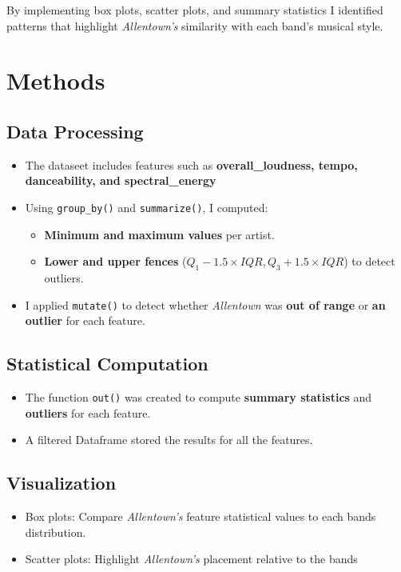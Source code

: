 \documentclass{article}\usepackage[]{graphicx}\usepackage[]{xcolor}
\begin{document}
\begin{multicols}{2}
\noindent By implementing box plots, scatter plots, and summary statistics I identified patterns that highlight \textit{Allentown's} similarity with each band's musical style.


\section{Methods}

\subsection{Data Processing}
\begin{itemize}
\item The dataseet includes features such as \textbf{overall\_loudness, tempo, danceability, and spectral\_energy}
\item Using \texttt{group\_by()} and \texttt{summarize()}, I computed:
\begin{itemize}
\item \textbf{Minimum and maximum values} per artist.
\item \textbf{Lower and upper fences} ($Q_1 - 1.5 \times IQR, Q_3 + 1.5 \times IQR$) to detect outliers.
\end{itemize}

\item I applied \texttt{mutate()} to detect whether \textit{Allentown} was \textbf{out of range} or \textbf{an outlier} for each feature.
\end{itemize}

\subsection{Statistical Computation}
\begin{itemize}
\item The function \texttt{out()} was created to compute \textbf{summary statistics} and \textbf{outliers} for each feature.
\item A filtered Dataframe stored the results for all the features.
\end{itemize}

\subsection{Visualization}
\begin{itemize}
\item Box plots: Compare \textit{Allentown's} feature statistical values to each bands distribution.
\item Scatter plots: Highlight \textit{Allentown's} placement relative to the bands
\end{itemize}



\end{multicols}
\end{document}
